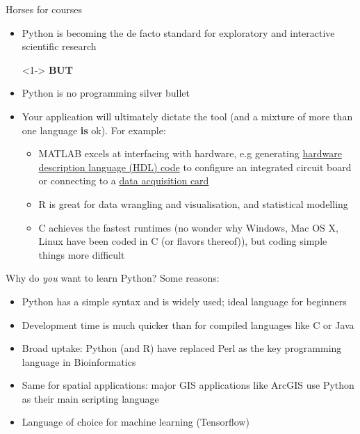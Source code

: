 \documentclass[xcolor=table]{beamer}
\begin{document}
\begin{frame}{Horses for courses}

\begin{itemize}\addtolength{\itemsep}{0.5\baselineskip}
	\item<1-> Python is becoming the de facto standard for exploratory and interactive scientific research\\
	\item[]<1-> \textbf{BUT}
	\item<2-> Python is no programming silver bullet
	\item<3-> Your application will ultimately dictate the tool (and a mixture of more than one language \textbf{is} ok). For example:\\
	\begin{itemize}\addtolength{\itemsep}{0.8\baselineskip}
		\item<4-> MATLAB excels at interfacing with hardware, e.g generating \href{https://uk.mathworks.com/products/hdl-coder.html}{hardware description language (HDL) code} to configure an integrated circuit board or connecting to a \href{https://uk.mathworks.com/products/daq.html}{data acquisition card}
		\item<5-> R is great for data wrangling and visualisation, and statistical modelling
        \item<6-> C achieves the fastest runtimes (no wonder why Windows, Mac OS X, Linux have been coded in C (or flavors thereof)), but coding simple things more difficult
	\end{itemize}
\end{itemize}

\end{frame}


\begin{frame}{Why do \textit{you} want to learn Python?}
    Some reasons:
    \pause
    \begin{itemize}
        \item Python has a simple syntax and is widely used; ideal language for beginners
            \pause
        \item Development time is much quicker than for compiled languages like C or Java
            \pause
        \item Broad uptake: Python (and R) have replaced Perl as the key programming language in Bioinformatics
            \pause
        \item Same for spatial applications: major GIS applications like ArcGIS use Python as their main scripting language
        \item Language of choice for machine learning (Tensorflow) 
            \pause
    \end{itemize}
\end{frame}
\end{document}
